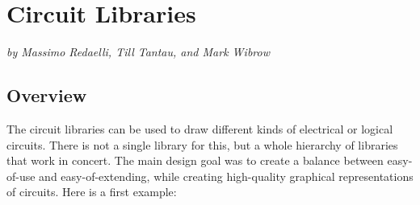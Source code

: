 %
%
%


\section{Circuit Libraries}
\label{section-library-circuits}

\emph{by Massimo Redaelli, Till Tantau, and Mark Wibrow}


\subsection{Overview}

The circuit libraries can be used to draw different kinds of
electrical or logical circuits. There is not a single library for
this, but a whole hierarchy of libraries that work in concert. The
main design goal was to create a balance between easy-of-use and
easy-of-extending, while creating high-quality graphical
representations of circuits. Here is a first example:

